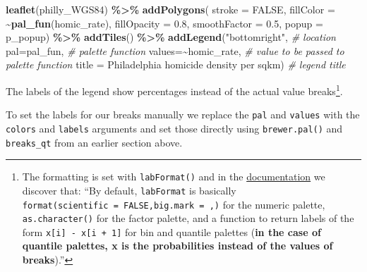 \documentclass[
]{book}
\newenvironment{Shaded}{\begin{snugshade}}{\end{snugshade}}
\newcommand{\AttributeTok}[1]{\textcolor[rgb]{0.13,0.29,0.53}{#1}}
\newcommand{\CommentTok}[1]{\textcolor[rgb]{0.56,0.35,0.01}{\textit{#1}}}
\newcommand{\ConstantTok}[1]{\textcolor[rgb]{0.56,0.35,0.01}{#1}}
\newcommand{\FloatTok}[1]{\textcolor[rgb]{0.00,0.00,0.81}{#1}}
\newcommand{\FunctionTok}[1]{\textcolor[rgb]{0.13,0.29,0.53}{\textbf{#1}}}
\newcommand{\NormalTok}[1]{#1}
\newcommand{\SpecialCharTok}[1]{\textcolor[rgb]{0.81,0.36,0.00}{\textbf{#1}}}
\newcommand{\StringTok}[1]{\textcolor[rgb]{0.31,0.60,0.02}{#1}}
\begin{document}
\begin{Shaded}
\begin{Highlighting}[]
\FunctionTok{leaflet}\NormalTok{(philly\_WGS84) }\SpecialCharTok{\%\textgreater{}\%}
  \FunctionTok{addPolygons}\NormalTok{(}
    \AttributeTok{stroke =} \ConstantTok{FALSE}\NormalTok{, }
    \AttributeTok{fillColor =} \SpecialCharTok{\textasciitilde{}}\FunctionTok{pal\_fun}\NormalTok{(homic\_rate),}
    \AttributeTok{fillOpacity =} \FloatTok{0.8}\NormalTok{, }\AttributeTok{smoothFactor =} \FloatTok{0.5}\NormalTok{,}
    \AttributeTok{popup =}\NormalTok{ p\_popup) }\SpecialCharTok{\%\textgreater{}\%}
  \FunctionTok{addTiles}\NormalTok{() }\SpecialCharTok{\%\textgreater{}\%}
  \FunctionTok{addLegend}\NormalTok{(}\StringTok{"bottomright"}\NormalTok{,  }\CommentTok{\# location}
            \AttributeTok{pal=}\NormalTok{pal\_fun,    }\CommentTok{\# palette function}
            \AttributeTok{values=}\SpecialCharTok{\textasciitilde{}}\NormalTok{homic\_rate,  }\CommentTok{\# value to be passed to palette function}
            \AttributeTok{title =} \StringTok{\textquotesingle{}Philadelphia homicide density per sqkm\textquotesingle{}}\NormalTok{) }\CommentTok{\# legend title}
\end{Highlighting}
\end{Shaded}

The labels of the legend show percentages instead of the actual value breaks\footnote{The formatting is set with \texttt{labFormat()} and in the \href{https://cran.r-project.org/web/packages/leaflet/leaflet.pdf}{documentation} we discover that: ``By default, \texttt{labFormat} is basically \texttt{format(scientific\ =\ FALSE,big.mark\ =\ \textquotesingle{},\textquotesingle{})} for the numeric palette, \texttt{as.character()} for the factor palette, and a function to return labels of the form \texttt{x{[}i{]}\ -\ x{[}i\ +\ 1{]}} for bin and quantile palettes (\textbf{in the case of quantile palettes, x is the probabilities instead of the values of breaks}).''}.

To set the labels for our breaks manually we replace the \texttt{pal} and \texttt{values} with the \texttt{colors} and \texttt{labels} arguments and set those directly using \texttt{brewer.pal()} and \texttt{breaks\_qt} from an earlier section above.
\end{document}
